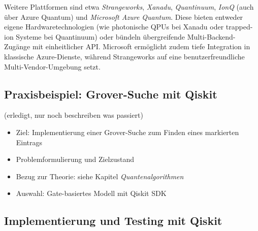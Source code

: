 Weitere Plattformen sind etwa \textit{Strangeworks}, \textit{Xanadu}, \textit{Quantinuum}, \textit{IonQ} (auch über Azure Quantum) und \textit{Microsoft Azure Quantum}. Diese bieten entweder eigene Hardwaretechnologien (wie photonische QPUs bei Xanadu oder trapped-ion Systeme bei Quantinuum) oder bündeln übergreifende Multi-Backend-Zugänge mit einheitlicher API. Microsoft ermöglicht zudem tiefe Integration in klassische Azure-Dienste, während Strangeworks auf eine benutzerfreundliche Multi-Vendor-Umgebung setzt.










\subsection{Praxisbeispiel: Grover-Suche mit Qiskit} (erledigt, nur noch beschreiben was passiert)
\begin{itemize}
    \item Ziel: Implementierung einer Grover-Suche zum Finden eines markierten Eintrags
    \item Problemformulierung und Zielzustand
    \item Bezug zur Theorie: siehe Kapitel \textit{Quantenalgorithmen}
    \item Auswahl: Gate-basiertes Modell mit Qiskit SDK
\end{itemize}

\subsection{Implementierung und Testing mit Qiskit}

